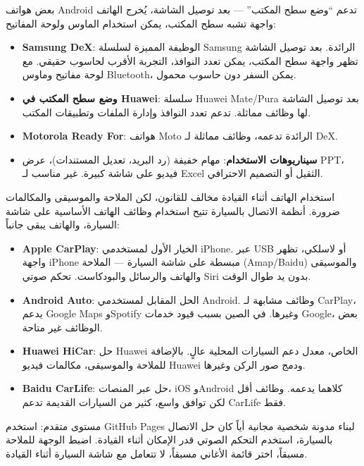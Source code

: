
بعض هواتف Android تدعم “وضع سطح المكتب” — بعد توصيل الشاشة، يُخرج الهاتف واجهة تشبه سطح المكتب، يمكن استخدام الماوس ولوحة المفاتيح:

\begin{itemize}
  \item \textbf{Samsung DeX}: الوظيفة المميزة لسلسلة Samsung الرائدة. بعد توصيل الشاشة تظهر واجهة سطح المكتب، يمكن تعدد النوافذ، التجربة الأقرب لحاسوب حقيقي. مع لوحة مفاتيح وماوس Bluetooth، يمكن السفر دون حاسوب محمول.
  \item \textbf{وضع سطح المكتب في Huawei}: سلسلة Huawei Mate/Pura بعد توصيل الشاشة لها وظائف مماثلة. تدعم تعدد النوافذ وإدارة الملفات وتطبيقات المكتب.
  \item \textbf{Motorola Ready For}: هواتف Moto الرائدة تدعمه، وظائف مماثلة لـ DeX.
  \item \textbf{سيناريوهات الاستخدام}: مهام خفيفة (رد البريد، تعديل المستندات)، عرض PPT، فيديو على شاشة كبيرة. غير مناسب لـ Excel الثقيل أو التصميم الاحترافي.
\end{itemize}


استخدام الهاتف أثناء القيادة مخالف للقانون، لكن الملاحة والموسيقى والمكالمات ضرورة. أنظمة الاتصال بالسيارة تتيح استخدام وظائف الهاتف الأساسية على شاشة السيارة، والهاتف يبقى جانباً:

\begin{itemize}
  \item \textbf{Apple CarPlay}: الخيار الأول لمستخدمي iPhone. عبر USB أو لاسلكي، تظهر واجهة iPhone مبسطة على شاشة السيارة — الملاحة (Amap/Baidu) والموسيقى والهاتف والرسائل والبودكاست. تحكم صوتي Siri بدون يد طوال الوقت.
  \item \textbf{Android Auto}: الحل المقابل لمستخدمي Android. وظائف مشابهة لـ CarPlay، يدعم Google Maps وSpotify وغيرها. في الصين بسبب قيود خدمات Google، بعض الوظائف غير متاحة.
  \item \textbf{Huawei HiCar}: حل Huawei الخاص، معدل دعم السيارات المحلية عالٍ. بالإضافة للملاحة والموسيقى، مكالمات فيديو Huawei ودمج صور الركن وغيرها.
  \item \textbf{Baidu CarLife}: حل عبر المنصات، iOS وAndroid كلاهما يدعمه. وظائف أقل لكن توافق واسع، كثير من السيارات القديمة تدعم CarLife فقط.
\end{itemize}

\begin{tcbwarn}{مستوى متقدم: استخدم GitHub Pages لبناء مدونة شخصية مجانية}
أياً كان حل الاتصال بالسيارة، استخدم التحكم الصوتي قدر الإمكان أثناء القيادة. اضبط الوجهة للملاحة مسبقاً، اختر قائمة الأغاني مسبقاً، لا تتعامل مع شاشة السيارة أثناء القيادة.

\end{tcbwarn}

